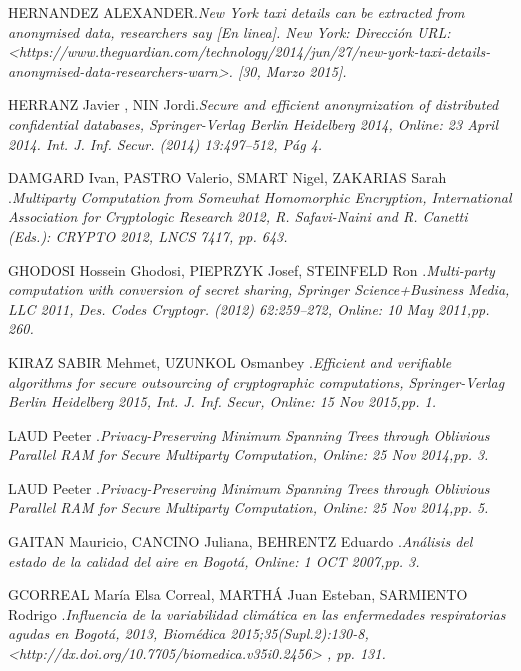 \documentclass[a4paper, 11pt, oneside]{article}
\theoremstyle{definition}
\theoremstyle{remark}
\begin{document}
\begin{thebibliography}{99}
HERNANDEZ ALEXANDER.\emph{New York taxi details can be extracted from anonymised data, researchers say [En linea]. New York: Dirección URL: <https://www.theguardian.com/technology/2014/jun/27/new-york-taxi-details-anonymised-data-researchers-warn>. [30, Marzo 2015].}

HERRANZ Javier , NIN Jordi.\emph{Secure and efficient anonymization of distributed confidential databases, Springer-Verlag Berlin Heidelberg 2014, Online: 23 April 2014. Int. J. Inf. Secur. (2014) 13:497–512, Pág 4.}

DAMGARD Ivan, PASTRO Valerio, SMART Nigel, ZAKARIAS Sarah .\emph{Multiparty Computation from Somewhat Homomorphic Encryption, International Association for Cryptologic Research 2012, R. Safavi-Naini and R. Canetti (Eds.): CRYPTO 2012, LNCS 7417, pp. 643.}

GHODOSI Hossein Ghodosi, PIEPRZYK Josef, STEINFELD Ron .\emph{Multi-party computation with conversion of secret sharing, Springer Science+Business Media, LLC 2011, Des. Codes Cryptogr. (2012) 62:259–272, Online: 10 May 2011,pp. 260.}

KIRAZ SABIR Mehmet, UZUNKOL Osmanbey .\emph{Efficient and verifiable algorithms for secure outsourcing of cryptographic computations, Springer-Verlag Berlin Heidelberg 2015, Int. J. Inf. Secur, Online: 15 Nov 2015,pp. 1.}

LAUD Peeter .\emph{Privacy-Preserving Minimum Spanning Trees through Oblivious Parallel RAM for Secure Multiparty Computation, Online: 25 Nov 2014,pp. 3.}

LAUD Peeter .\emph{Privacy-Preserving Minimum Spanning Trees through Oblivious Parallel RAM for Secure Multiparty Computation, Online: 25 Nov 2014,pp. 5.}

 GAITAN Mauricio, CANCINO Juliana, BEHRENTZ Eduardo .\emph{Análisis del estado de la calidad del aire en Bogotá, Online: 1 OCT 2007,pp. 3.}

 GCORREAL María Elsa Correal, MARTHÁ Juan Esteban, SARMIENTO Rodrigo .\emph{Influencia de la variabilidad climática en las enfermedades respiratorias agudas en Bogotá, 2013, Biomédica 2015;35(Supl.2):130-8, <http://dx.doi.org/10.7705/biomedica.v35i0.2456> , pp. 131.}


\end{thebibliography}
\end{document}
